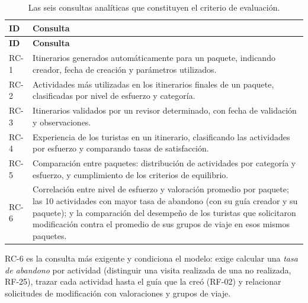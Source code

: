 \documentclass[11pt,a4paper]{article}
\begin{document}
{\footnotesize\setlength{\tabcolsep}{3pt}\renewcommand{\arraystretch}{1.15}
\begin{longtable}{|>{\raggedright\arraybackslash}p{1.28cm}|>{\raggedright\arraybackslash}p{14.48cm}|}
\caption{Las seis consultas analíticas que constituyen el criterio de evaluación.}\label{tab:consultas}\\ \hline
\rowcolor{gray!20} \textbf{ID} & \textbf{Consulta} \\ \hline
\endfirsthead
\hline \rowcolor{gray!20} \textbf{ID} & \textbf{Consulta} \\ \hline
\endhead
RC-1 & Itinerarios generados automáticamente para un paquete, indicando creador, fecha de creación y parámetros utilizados. \\ \hline
RC-2 & Actividades más utilizadas en los itinerarios finales de un paquete, clasificadas por nivel de esfuerzo y categoría. \\ \hline
RC-3 & Itinerarios validados por un revisor determinado, con fecha de validación y observaciones. \\ \hline
RC-4 & Experiencia de los turistas en un itinerario, clasificando las actividades por esfuerzo y comparando tasas de satisfacción. \\ \hline
RC-5 & Comparación entre paquetes: distribución de actividades por categoría y esfuerzo, y cumplimiento de los criterios de equilibrio. \\ \hline
RC-6 & Correlación entre nivel de esfuerzo y valoración promedio por paquete; las 10 actividades con mayor tasa de abandono (con su guía creador y su paquete); y la comparación del desempeño de los turistas que solicitaron modificación contra el promedio de sus grupos de viaje en esos mismos paquetes. \\ \hline
\end{longtable}}
\vspace{2pt}
RC-6 es la consulta más exigente y condiciona el modelo: exige calcular una \textit{tasa de abandono} por actividad (distinguir una visita realizada de una no realizada, RF-25), trazar cada actividad hasta el guía que la creó (RF-02) y relacionar solicitudes de modificación con valoraciones y grupos de viaje.
\end{document}
